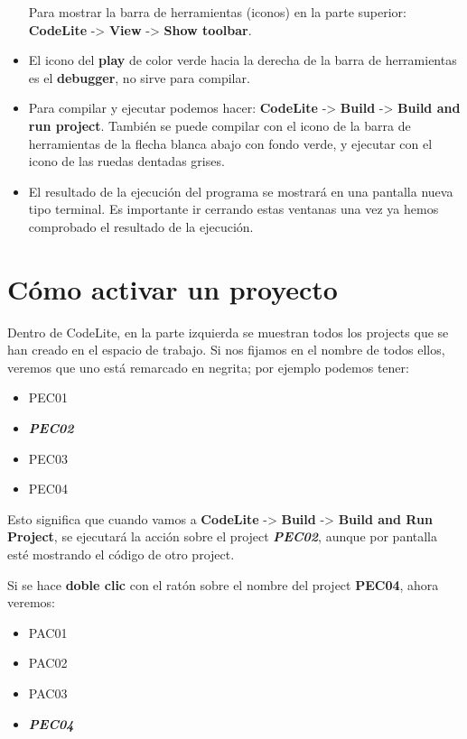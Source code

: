 \documentclass[
]{book}
\providecommand{\tightlist}{%
  \setlength{\itemsep}{0pt}\setlength{\parskip}{0pt}}
\begin{document}
\begin{itemize}
  Para mostrar la barra de herramientas (iconos) en la parte superior: \textbf{CodeLite} -\textgreater{} \textbf{View} -\textgreater{} \textbf{Show toolbar}.
\item
  El icono del \textbf{play} de color verde hacia la derecha de la barra de herramientas es el \textbf{debugger}, no sirve para compilar.
\item
  Para compilar y ejecutar podemos hacer: \textbf{CodeLite} -\textgreater{} \textbf{Build} -\textgreater{} \textbf{Build and run project}. También se puede compilar con el icono de la barra de herramientas de la flecha blanca abajo con fondo verde, y ejecutar con el icono de las ruedas dentadas grises.
\item
  El resultado de la ejecución del programa se mostrará en una pantalla nueva tipo terminal. Es importante ir cerrando estas ventanas una vez ya hemos comprobado el resultado de la ejecución.
\end{itemize}

\hypertarget{cuxf3mo-activar-un-proyecto}{%
\section{Cómo activar un proyecto}\label{cuxf3mo-activar-un-proyecto}}

Dentro de CodeLite, en la parte izquierda se muestran todos los projects que se han creado en el espacio de trabajo. Si nos fijamos en el nombre de todos ellos, veremos que uno está remarcado en negrita; por ejemplo podemos tener:

\begin{itemize}
\tightlist
\item
  PEC01
\item
  \textbf{\emph{PEC02}}
\item
  PEC03
\item
  PEC04
\end{itemize}

Esto significa que cuando vamos a \textbf{CodeLite} -\textgreater{} \textbf{Build} -\textgreater{} \textbf{Build and Run Project}, se ejecutará la acción sobre el project \textbf{\emph{PEC02}}, aunque por pantalla esté mostrando el código de otro project.

Si se hace \textbf{doble clic} con el ratón sobre el nombre del project \textbf{PEC04}, ahora veremos:

\begin{itemize}
\tightlist
\item
  PAC01
\item
  PAC02
\item
  PAC03
\item
  \textbf{\emph{PEC04}}
\end{itemize}
\end{document}
